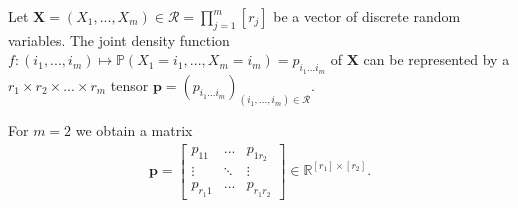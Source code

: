 Let \( \mathbf{X} = (X_1, ..., X_m) \in \mathcal{R} = \prod_{j=1}^m [r_j] \) be a vector of discrete random variables. The joint density function \( f: (i_1,...,i_m) \mapsto  \mathbb{P} (X_1 = i_1, ..., X_m = i_m) = p_{i_1 ... i_m} \) of \( \mathbf X \) can be represented by a \( r_1 \times r_2 \times ... \times r_m  \) tensor \( \mathbf p = (p_{i_1...i_m})_{(i_1,...,i_m) \in \mathcal{R}} \).

\begin{eg}
For \( m=2 \) we obtain a matrix 
\begin{align*}
  \mathbf p = \begin{bmatrix}
    p_{11} & ... & p_{1 r_2} \\ \vdots & \ddots & \vdots \\ p_{r_1 1} & ... & p_{r_1 r_2}
  \end{bmatrix} \in \mathbb R^{[r_1] \times [r_2]}.
\end{align*}

\end{eg}

